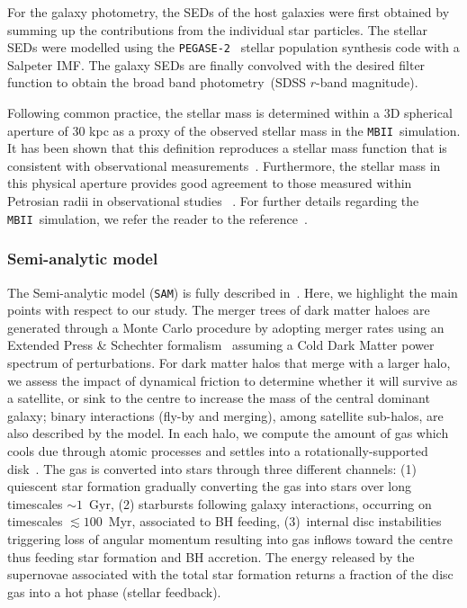 \documentclass[twocolumn,trackchanges]{aastex63}
\newcommand{\sam}{\texttt{SAM}}
\newcommand{\mbii}{\texttt{MBII}}
\begin{document}
For the galaxy photometry, the SEDs of the host galaxies were first obtained by summing up the contributions from the individual star particles. The stellar SEDs were modelled using the \texttt{PEGASE-2}~\citep{1999astro.ph.12179F} stellar population synthesis code with a Salpeter IMF. The galaxy SEDs are finally convolved with the desired filter function to obtain the broad band photometry~(SDSS $r$-band magnitude). 

Following common practice, the stellar mass is determined within a 3D spherical aperture of 30 kpc as a proxy of the observed stellar mass in the \mbii\ simulation. It has been shown that this definition reproduces a stellar mass function that is consistent with observational measurements~\citep{Pillepich2018}. Furthermore, the stellar mass in this physical aperture provides good agreement to those measured within Petrosian radii in observational studies ~\citep{Schaye2015}. For further details regarding the \mbii\ simulation, we refer the reader to the reference~\citep{2015MNRAS.450.1349K}.

\subsubsection{Semi-analytic model}
\label{sec_intro_SAM}
The Semi-analytic model (\sam) is fully described in~\citet{Menci2016}. Here, we highlight the main points with respect to our study. The merger trees of dark matter haloes are generated through a Monte Carlo procedure by adopting merger rates using an Extended Press \& Schechter formalism~\citep{Lacey1993} assuming a Cold Dark Matter power spectrum of perturbations. For dark matter halos  that merge with a larger halo, we assess the impact of dynamical friction to determine whether it will survive as a satellite, or sink to the centre to increase the mass of the central dominant galaxy; binary interactions (fly-by and merging), among satellite sub-halos, are also described by the model. In each halo, we compute the amount of gas which cools due through atomic processes and settles into a rotationally-supported disk~\citep{Mo1998}. The gas is converted into stars through three different channels: (1) quiescent star formation gradually converting the gas into stars over long timescales $\sim 1$~Gyr, (2) starbursts following galaxy interactions, occurring on timescales $\lesssim 100$~Myr, associated to BH feeding, (3)~internal disc instabilities triggering loss of angular momentum resulting into gas inflows toward the centre thus feeding star formation and BH accretion. The energy released by the supernovae associated with the total star formation returns a fraction of the disc gas into a hot phase (stellar feedback). 
\end{document}
